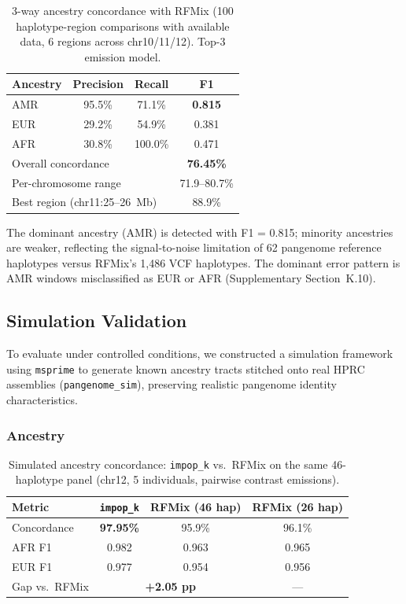 \begin{table}[ht]
\centering
\caption{3-way ancestry concordance with RFMix (100 haplotype-region comparisons with available data, 6 regions across chr10/11/12). Top-3 emission model.}
\label{tab:3way_results}
\begin{tabular}{lccc}
\hline
\textbf{Ancestry} & \textbf{Precision} & \textbf{Recall} & \textbf{F1} \\
\hline
AMR & 95.5\% & 71.1\% & \textbf{0.815} \\
EUR & 29.2\% & 54.9\% & 0.381 \\
AFR & 30.8\% & 100.0\% & 0.471 \\
\hline
\multicolumn{3}{l}{Overall concordance} & \textbf{76.45\%} \\
\multicolumn{3}{l}{Per-chromosome range} & 71.9--80.7\% \\
\multicolumn{3}{l}{Best region (chr11:25--26~Mb)} & 88.9\% \\
\hline
\end{tabular}
\end{table}

The dominant ancestry (AMR) is detected with F1 = 0.815; minority ancestries are weaker, reflecting the signal-to-noise limitation of 62 pangenome reference haplotypes versus RFMix's 1,486 VCF haplotypes. The dominant error pattern is AMR windows misclassified as EUR or AFR (Supplementary Section~K.10).

\subsection{Simulation Validation}
\label{sec:sim_ancestry}

To evaluate under controlled conditions, we constructed a simulation framework using \texttt{msprime} to generate known ancestry tracts stitched onto real HPRC assemblies (\texttt{pangenome\_sim}), preserving realistic pangenome identity characteristics.

\subsubsection{Ancestry}

\begin{table}[ht]
\centering
\caption{Simulated ancestry concordance: \texttt{impop\_k} vs.\ RFMix on the same 46-haplotype panel (chr12, 5 individuals, pairwise contrast emissions).}
\label{tab:sim_ancestry}
\begin{tabular}{lccc}
\hline
\textbf{Metric} & \textbf{\texttt{impop\_k}} & \textbf{RFMix (46 hap)} & \textbf{RFMix (26 hap)} \\
\hline
Concordance & \textbf{97.95\%} & 95.9\% & 96.1\% \\
AFR F1 & 0.982 & 0.963 & 0.965 \\
EUR F1 & 0.977 & 0.954 & 0.956 \\
Gap vs.\ RFMix & \multicolumn{2}{c}{\textbf{+2.05 pp}} & --- \\
\hline
\end{tabular}
\end{table}

